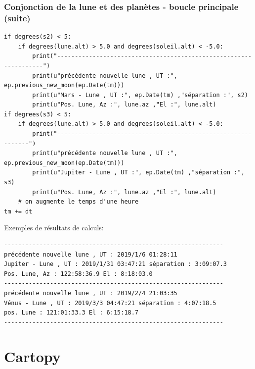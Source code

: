 \documentclass{beamer}
\begin{document}
\begin{frame}
\frametitle{Conjonction de la lune et des planètes - boucle principale (suite)}

\begin{verbatim}
if degrees(s2) < 5:
    if degrees(lune.alt) > 5.0 and degrees(soleil.alt) < -5.0:
        print("------------------------------------------------------------------")
        print(u"précédente nouvelle lune , UT :", ep.previous_new_moon(ep.Date(tm)))
        print(u"Mars - Lune , UT :", ep.Date(tm) ,"séparation :", s2)
        print(u"Pos. Lune, Az :", lune.az ,"El :", lune.alt)
if degrees(s3) < 5:
    if degrees(lune.alt) > 5.0 and degrees(soleil.alt) < -5.0:
        print("--------------------------------------------------------------")
        print(u"précédente nouvelle lune , UT :", ep.previous_new_moon(ep.Date(tm)))
        print(u"Jupiter - Lune , UT :", ep.Date(tm) ,"séparation :", s3)
        print(u"Pos. Lune, Az :", lune.az ,"El :", lune.alt)
    # on augmente le temps d'une heure
tm += dt
\end{verbatim}

Exemples de résultats de calculs:

\begin{Verbatim}[numbers=none,fontsize=\fontsize{9pt}{9pt},baselinestretch=0.95]
--------------------------------------------------------------
précédente nouvelle lune , UT : 2019/1/6 01:28:11
Jupiter - Lune , UT : 2019/1/31 03:47:21 séparation : 3:09:07.3
Pos. Lune, Az : 122:58:36.9 El : 8:18:03.0
--------------------------------------------------------------
précédente nouvelle lune , UT : 2019/2/4 21:03:35
Vénus - Lune , UT : 2019/3/3 04:47:21 séparation : 4:07:18.5
pos. Lune : 121:01:33.3 El : 6:15:18.7
--------------------------------------------------------------
\end{Verbatim}
\end{frame}

\section{Cartopy}
\end{document}
